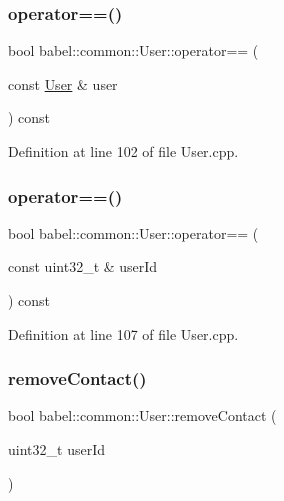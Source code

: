 \subsubsection{\texorpdfstring{operator==()}{operator==()}\hspace{0.1cm}{\footnotesize\ttfamily [1/2]}}
{\footnotesize\ttfamily bool babel\+::common\+::\+User\+::operator== (\begin{DoxyParamCaption}\item[{const \mbox{\hyperlink{classbabel_1_1common_1_1_user}{User}} \&}]{user }\end{DoxyParamCaption}) const}



Definition at line 102 of file User.\+cpp.

\mbox{\label{classbabel_1_1common_1_1_user_ae1fa1482613860ede04093a37f9316c0}} 
\subsubsection{\texorpdfstring{operator==()}{operator==()}\hspace{0.1cm}{\footnotesize\ttfamily [2/2]}}
{\footnotesize\ttfamily bool babel\+::common\+::\+User\+::operator== (\begin{DoxyParamCaption}\item[{const uint32\+\_\+t \&}]{user\+Id }\end{DoxyParamCaption}) const}



Definition at line 107 of file User.\+cpp.

\mbox{\label{classbabel_1_1common_1_1_user_ab2a3d75d5c02fe4a3cd2b9c066bb6445}} 
\subsubsection{\texorpdfstring{remove\+Contact()}{removeContact()}}
{\footnotesize\ttfamily bool babel\+::common\+::\+User\+::remove\+Contact (\begin{DoxyParamCaption}\item[{uint32\+\_\+t}]{user\+Id }\end{DoxyParamCaption})}



